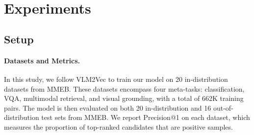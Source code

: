 \documentclass[11pt]{article}
\begin{document}
\section{Experiments}

\subsection{Setup}

\paragraph{Datasets and Metrics.} 
In this study, we follow VLM2Vec \cite{VLM2Vec} to train our model on 20 in-distribution datasets from MMEB. These datasets encompass four meta-tasks: classification, VQA, multimodal retrieval, and visual grounding, with a total of 662K training pairs. The model is then evaluated on both 20 in-distribution and 16 out-of-distribution test sets from MMEB. We report Precision@1 on each dataset, which measures the proportion of top-ranked candidates that are positive samples.
\end{document}
